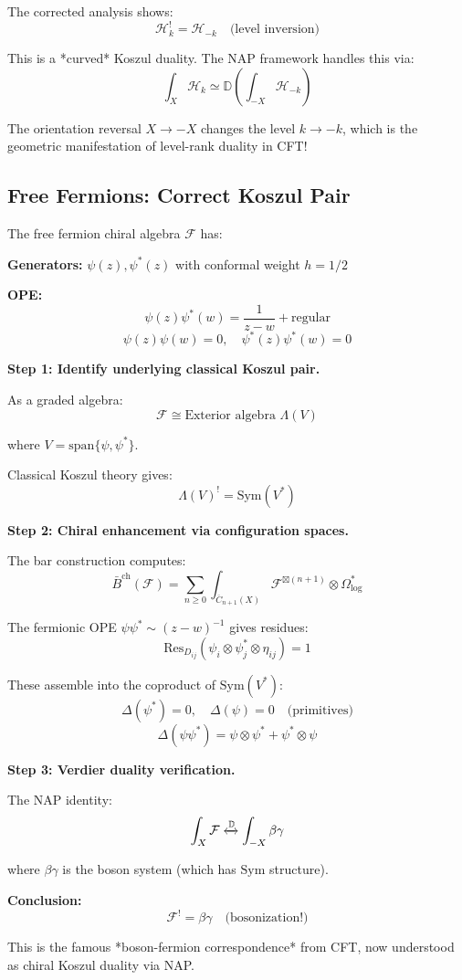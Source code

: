 \begin{remark}\label{rem:heisenberg-self-dual}
The corrected analysis shows:
$$\mathcal{H}_k^! = \mathcal{H}_{-k} \quad \text{(level inversion)}$$

This is a *curved* Koszul duality. The NAP framework handles this via:
$$\int_X \mathcal{H}_k \simeq \mathbb{D}\left(\int_{-X} \mathcal{H}_{-k}\right)$$

The orientation reversal $X \to -X$ changes the level $k \to -k$, which is the geometric manifestation of level-rank duality in CFT!
\end{remark}

\subsection{Free Fermions: Correct Koszul Pair}

\begin{example}\label{ex:fermions-NAP}
The free fermion chiral algebra $\mathcal{F}$ has:

\textbf{Generators:} $\psi(z), \psi^*(z)$ with conformal weight $h = 1/2$

\textbf{OPE:}
$$\psi(z) \psi^*(w) = \frac{1}{z-w} + \text{regular}$$
$$\psi(z) \psi(w) = 0, \quad \psi^*(z) \psi^*(w) = 0$$

\textbf{Step 1: Identify underlying classical Koszul pair.}

As a graded algebra:
$$\mathcal{F} \cong \text{Exterior algebra } \Lambda(V)$$

where $V = \text{span}\{\psi, \psi^*\}$.

Classical Koszul theory gives:
$$\Lambda(V)^! = \text{Sym}(V^*)$$

\textbf{Step 2: Chiral enhancement via configuration spaces.}

The bar construction computes:
$$\bar{B}^{\text{ch}}(\mathcal{F}) = \sum_{n \geq 0} \int_{\overline{C}_{n+1}(X)} \mathcal{F}^{\boxtimes(n+1)} \otimes \Omega^*_{\log}$$

The fermionic OPE $\psi \psi^* \sim (z-w)^{-1}$ gives residues:
$$\text{Res}_{D_{ij}}(\psi_i \otimes \psi^*_j \otimes \eta_{ij}) = 1$$

These assemble into the coproduct of $\text{Sym}(V^*)$:
$$\Delta(\psi^*) = 0, \quad \Delta(\psi) = 0 \quad \text{(primitives)}$$
$$\Delta(\psi \psi^*) = \psi \otimes \psi^* + \psi^* \otimes \psi$$

\textbf{Step 3: Verdier duality verification.}

The NAP identity:
$$\int_X \mathcal{F} \xleftrightarrow{\mathbb{D}} \int_{-X} \beta\gamma$$

where $\beta\gamma$ is the boson system (which has $\text{Sym}$ structure).

\textbf{Conclusion:}
$$\mathcal{F}^! = \beta\gamma \quad \text{(bosonization!)}$$

This is the famous *boson-fermion correspondence* from CFT, now understood as chiral Koszul duality via NAP.
\end{example}


